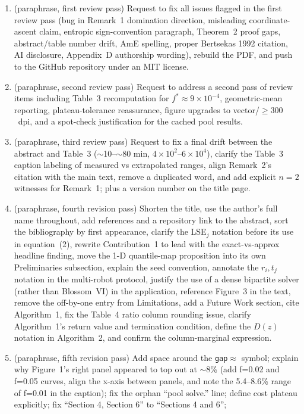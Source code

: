 \documentclass[11pt]{article}
\theoremstyle{remark}
\begin{document}
\begin{enumerate}[leftmargin=2em,itemsep=2pt]
\item (paraphrase, first review pass) Request to fix all issues flagged in
the first review pass (bug in Remark~1 domination direction, misleading
coordinate-ascent claim, entropic sign-convention paragraph, Theorem~2
proof gaps, abstract/table number drift, AmE spelling, proper Bertsekas
1992 citation, AI disclosure, Appendix~D authorship wording), rebuild the
PDF, and push to the GitHub repository under an MIT license.
\item (paraphrase, second review pass) Request to address a second pass
of review items including Table~3 recomputation for $f^*\approx 9\times 10^{-4}$,
geometric-mean reporting, plateau-tolerance reassurance, figure upgrades
to vector/$\ge 300$~dpi, and a spot-check justification for the cached
pool results.
\item (paraphrase, third review pass) Request to fix a final drift
between the abstract and Table~3 ($\sim$10--$\sim$80 min, $4\times 10^2$--$6\times 10^4$),
clarify the Table~3 caption labeling of measured vs extrapolated ranges,
align Remark~2's citation with the main text, remove a duplicated word,
and add explicit $n=2$ witnesses for Remark~1; plus a version number on
the title page.
\item (paraphrase, fourth revision pass) Shorten the title, use the
author's full name throughout, add references and a repository link to
the abstract, sort the bibliography by first appearance, clarify the
LSE$_j$ notation before its use in equation~(2), rewrite Contribution~1
to lead with the exact-vs-approx headline finding, move the 1-D
quantile-map proposition into its own Preliminaries subsection, explain
the seed convention, annotate the $r_i,t_j$ notation in the multi-robot
protocol, justify the use of a dense bipartite solver (rather than
Blossom~VI) in the application, reference Figure~3 in the text, remove
the off-by-one entry from Limitations, add a Future Work section, cite
Algorithm~1, fix the Table~4 ratio column rounding issue, clarify
Algorithm~1's return value and termination condition, define the $D(z)$
notation in Algorithm~2, and confirm the column-marginal expression.
\item (paraphrase, fifth revision pass) Add space around the
\texttt{gap$\approx$} symbol; explain why Figure~1's right panel
appeared to top out at $\sim$8\% (add f=0.02 and f=0.05 curves, align
the x-axis between panels, and note the 5.4--8.6\% range of f=0.01 in
the caption); fix the orphan ``pool solve.'' line; define cost plateau
explicitly; fix ``Section 4, Section 6'' to ``Sections 4 and 6'';

\end{enumerate}
\end{document}
